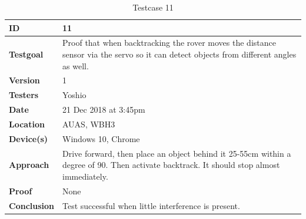 \documentclass[12pt]{article}
\begin{document}
	\begin{table}[H]
		\centering
		\begin{tabularx}{\linewidth}{|X|X|}
			\hline
			\textbf{ID} &11\\
			\hline
			\textbf{Testgoal} &Proof that when backtracking the rover moves the distance sensor via the servo so it can detect objects from different angles as well.\\
			\hline
			\textbf{Version} &1\\
			\hline
			\textbf{Testers} &Yoshio\\
			\hline
			\textbf{Date} &21 Dec 2018 at 3:45pm\\
			\hline
			\textbf{Location} &AUAS, WBH3\\
			\hline
			\textbf{Device(s)} &Windows 10, Chrome\\
			\hline
			\textbf{Approach} &Drive forward, then place an object behind it 25-55cm within a degree of 90. Then activate backtrack. It should stop almost immediately.\\
			\hline
			\textbf{Proof} &None\\
			\hline
			\textbf{Conclusion} &Test successful when little interference is present.\\
			\hline
		\end{tabularx}
		\caption{Testcase 11}
		\label{table:Testcase 11}   
	\end{table}
\end{document}
